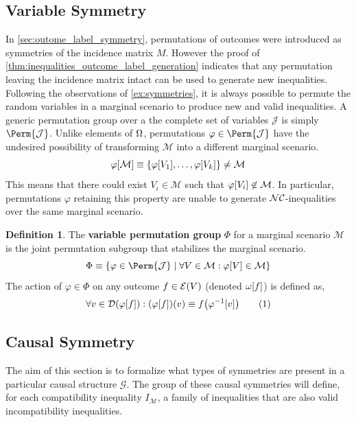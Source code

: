 \documentclass[aps, 10pt, english, twoside, pra, nofootinbib, longbibliography]{revtex4-1}
\theoremstyle{plain}
\theoremstyle{definition}
\newtheorem{definition}[theorem]{Definition}
\theoremstyle{remark}
\newcommand{\graph}{\mathcal{G}}
\newcommand{\gep}{\varphi}
\newcommand{\gp}{\Phi}
\newcommand{\geo}{\omega}
\newcommand{\mscenario}{\mathcal{M}}
\newcommand{\jointvar}{\mathcal{J}}
\newcommand{\term}[1]{\textcolor{Mahogany}{\textbf{#1}}}
\newcommand{\Events}[1]{\s{E}\br{#1}} %
\newcommand{\Dom}[1]{\s{D}\br{#1}} %
\begin{document}
    \subsection{Variable Symmetry}

    In \cref{sec:outome_label_symmetry}, permutations of outcomes were introduced as symmetries of the incidence matrix $M$. However the proof of \cref{thm:inequalities_outcome_label_generation} indicates that any permutation leaving the incidence matrix intact can be used to generate new inequalities. \\

    Following the observations of \cref{ex:symmetries}, it is always possible to permute the random variables in a marginal scenario to produce new and valid inequalities. A generic permutation group over a the complete set of variables $\jointvar$ is simply $\Perm{\jointvar}$. Unlike elements of $\Omega$, permutations $\gep \in \Perm{\jointvar}$ have the undesired possibility of transforming $\mscenario$ into a different marginal scenario.
    \[ \gep\bs{\mscenario} \defined \bc{\gep\bs{V_1}, \ldots, \gep\bs{V_k}} \neq \mscenario \]
    This means that there could exist $V_i \in \mscenario$ such that $\gep\bs{V_i} \not \in \mscenario$. In particular, permutations $\gep$ retaining this property are unable to generate $\mathcal{NC}$-inequalities over the same marginal scenario.

    \begin{definition}
        The \term{variable permutation group} $\gp$ for a marginal scenario $\mscenario$ is the joint permutation subgroup that stabilizes the marginal scenario.
        \[ \Phi \defined \bc{\gep \in \Perm{\jointvar} \mid \forall V \in \mscenario : \gep\bs{V} \in \mscenario} \]
        The action of $\gep \in \gp$ on any outcome $f \in \Events{V}$ (denoted $\geo\bs{f}$) is defined as,
        \[ \forall v \in \Dom{\gep\bs{f}} : \br{\gep\bs{f}}\br{v} \defined f\br{\gep^{-1}\bs{v}} \eq \label{eq:act_on_variable}\]
    \end{definition}


    \subsection{Causal Symmetry}

    The aim of this section is to formalize what types of symmetries are present in a particular causal structure $\graph$. The group of these causal symmetries will define, for each compatibility inequality $I_{\mscenario}$, a family of inequalities that are also valid incompatibility inequalities.
\end{document}
